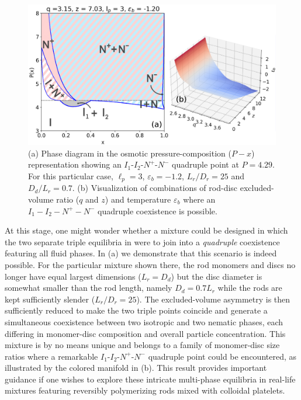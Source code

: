 \begin{figure}[ht]
  \includegraphics[width=0.9 \linewidth]{figures/chapter-2/FIG6}
\caption[Phase diagram in the osmotic pressure-composition showing a quadruple point]{(a) Phase diagram in the osmotic pressure-composition ($P-x$) representation showing an $I_{1}$-$I_{2}$-$N^{+}$-$N^{-}$ quadruple point at $P = 4.29$. For this particular case, $\ell_{p} = 3$, $\varepsilon_{b} = -1.2$, $L_{r}/D_{r} =25$ and $D_{d}/L_{r} = 0.7$. (b) Visualization of combinations of rod-disc excluded-volume ratio ($q$ and $z$) and temperature $\varepsilon_{b}$ where  an $I_{1}-I_{2}-N^{+}-N^{-}$ quadruple coexistence is possible.  }
\label{fig:qp}
\end{figure}

At this stage, one might wonder whether a mixture could be designed in which  the two separate triple equilibria  in  were to join into a  {\em quadruple} coexistence featuring all fluid phases. In (a) we demonstrate that this scenario is indeed possible. For the particular mixture shown there, the rod monomers and discs no longer have equal largest dimensions ($L_{r}= D_{d}$) but the disc diameter is somewhat smaller than the rod length, namely $D_{d} =0.7 L_{r}$ while the rods are kept sufficiently slender ($L_{r}/D_{r} = 25$). The  excluded-volume asymmetry is then sufficiently reduced to make the two triple points coincide and generate a simultaneous coexistence between two isotropic and two nematic phases, each differing in monomer-disc composition and overall particle concentration. This mixture is by no means  unique and belongs to a family of monomer-disc size ratios where a remarkable $I_{1}$-$I_{2}$-$N^{+}$-$N^{-}$ quadruple point could be encountered, as illustrated by the colored manifold in (b). This result provides important guidance if one wishes to explore these intricate multi-phase equilibria in real-life mixtures featuring reversibly polymerizing rods mixed with colloidal platelets.

